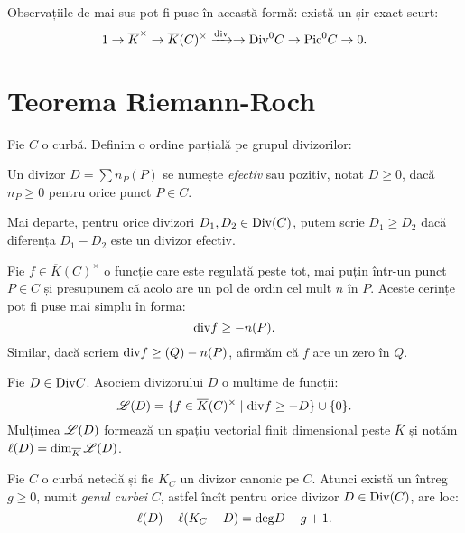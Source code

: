 Observațiile de mai sus pot fi puse în această formă: există un șir exact scurt:
\[
    1 \to \overline{K}^\times \to \overline{K}(C)^\times \xrar{\dr{div}}%
    \to \dr{Div}^0 C \to \dr{Pic}^0 C \to 0.
\]

\section{Teorema Riemann-Roch}

Fie $ C $ o curbă. Definim o ordine parțială pe grupul divizorilor:
\begin{definition}\label{def:ordine-div}
    Un divizor $ D = \sum n_P(P) $ se numește \emph{efectiv} sau pozitiv,
    notat $ D \geq 0 $, dacă $ n_P \geq 0 $ pentru orice punct $ P \in C $.

    Mai departe, pentru orice divizori $ D_1, D_2 \in \mathrm{Div}(C) $,
    putem scrie $ D_1 \geq D_2 $ dacă diferența $ D_1 - D_2 $ este un divizor efectiv.
\end{definition}

\begin{example}\label{exm:div-efectiv}
    Fie $ f \in \overline{K}(C)^\times $ o funcție care este regulată peste tot,
    mai puțin într-un punct $ P \in C $ și presupunem că acolo are un pol de ordin
    cel mult $ n $ în $ P $. Aceste cerințe pot fi puse mai simplu în forma:
    \[
        \mathrm{div}f \geq -n(P).
    \]
    Similar, dacă scriem $ \mathrm{div}f \geq (Q) - n(P) $, afirmăm că $ f $ are un
    zero în $ Q $.
\end{example}

\begin{definition}\label{def:functii-div}
    Fie $ D \in \mathrm{Div}C $. Asociem divizorului $ D $ o mulțime de funcții:
    \[
        \mathscr{L}(D) = \{ f \in \overline{K}(C)^\times \mid \mathrm{div}f \geq -D \} \cup \{0\}.
    \]
    Mulțimea $ \mathscr{L}(D) $ formează un spațiu vectorial finit dimensional peste
    $ \overline{K} $ și notăm $ \ell(D) = \dim_{\overline{K}}\mathscr{L}(D) $.
\end{definition}

\begin{theorem}\label{thm:riemann-roch}
    Fie $ C $ o curbă netedă și fie $ K_C $ un divizor canonic pe $ C $.
    Atunci există un întreg $ g \geq 0 $, numit \emph{genul curbei} $ C $,
    astfel încît pentru orice divizor $ D \in \mathrm{Div}(C) $, are loc:
    \[
        \ell(D) - \ell(K_C - D) = \mathrm{deg}D - g + 1.
    \]
\end{theorem}


